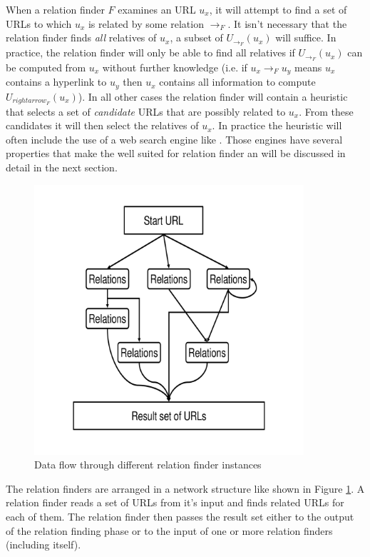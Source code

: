 \documentclass[a4paper]{danarticle}
\theoremstyle{remark}
\begin{document}
       When a relation finder $ F $ examines an URL $ u_x $, it will attempt to 
       find a set of URLs to which $ u_x $ is related by some relation 
       $ \rightarrow_F $. It isn't necessary that the relation finder finds 
       \emph{all} relatives of $ u_x $, a subset of $ U_{\rightarrow_F}(u_x) $ 
       will suffice. In practice, the relation finder will only be able to find 
       all relatives if $ U_{\rightarrow_F}(u_x) $ can be computed from $ u_x $ 
       without further knowledge (i.e. if $ u_x \rightarrow_F u_y $ means 
       $ u_x $ contains a hyperlink to $ u_y $ then $ u_x $ contains all 
       information to compute $ U_{rightarrow_F}(u_x) $). In all other cases the 
       relation finder will contain a heuristic that selects a set of 
       \textit{candidate} URLs that are possibly related to $ u_x $. From these 
       candidates it will then select the relatives of $ u_x $. In practice the 
       heuristic will often include the use of a web search engine like 
       \cite{google}. Those engines have several properties that make the well 
       suited for relation finder an will be discussed in detail in the next 
       section.
       \begin{figure}[ht]
         \centering
	     \includegraphics[width=10cm]{relations}
	     \caption{Data flow through different relation finder instances}
	     \label{relations}
       \end{figure}
       The relation finders are arranged in a network structure like shown in 
       Figure \ref{relations}. A relation finder reads a set of URLs from it's 
       input and finds related URLs for each of them. The relation 
       finder then passes the result set either to the output of the relation 
       finding phase or to the input of one or more relation finders (including 
       itself).
       
\end{document}
